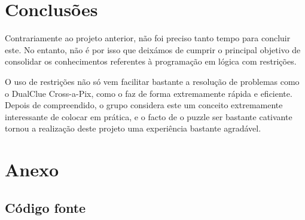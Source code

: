 \documentclass[runningheads,a4paper]{llncs}
\begin{document}
\section{Conclusões}
Contrariamente ao projeto anterior, não foi preciso tanto tempo para concluir este. No entanto, não é por isso que deixámos de cumprir o principal objetivo de consolidar os conhecimentos referentes à programação em lógica com restrições.

O uso de restrições não só vem facilitar bastante a resolução de problemas como o DualClue Cross-a-Pix, como o faz de forma extremamente rápida e eficiente. Depois de compreendido, o grupo considera este um conceito extremamente interessante de colocar em prática, e o facto de o puzzle ser bastante cativante tornou a realização deste projeto uma experiência bastante agradável. 

\section*{Anexo}

\subsection*{Código fonte}

\end{document}
